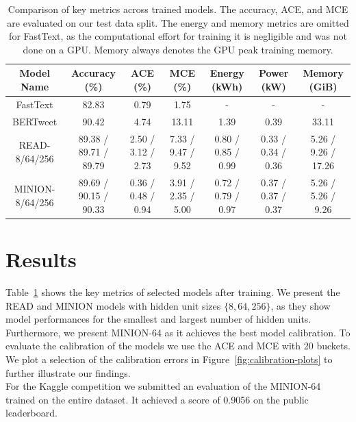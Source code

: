 \documentclass[10pt,conference,compsocconf]{IEEEtran}
\begin{document}
\begin{table}
    \centering
    \begin{tabular}[H]{|c||c|cc|ccc|}
        \hline
        Model Name & Accuracy (\%) & ACE (\%) & MCE  (\%) & Energy (kWh) & Power (kW) & Memory (GiB) \\
        \hline
        FastText & 82.83 & 0.79 & 1.75 & - & - & - \\
        BERTweet & 90.42 & 4.74 & 13.11 & 1.39 & 0.39 & 33.11 \\
        READ-8/64/256    & 89.38 / 89.71 / 89.79 & 2.50 / 3.12 / 2.73 & 7.33 / 9.47 / 9.52 & 0.80 / 0.85 / 0.99 & 0.33 / 0.34 / 0.36 & 5.26 / 9.26 / 17.26 \\
        \hline
        MINION-8/64/256 & 89.69 / 90.15 / 90.33 & 0.36 / 0.48 / 0.94 & 3.91 / 2.35 / 5.00 & 0.72 / 0.79 / 0.97 & 0.37 / 0.37 / 0.37 & 5.26 / 5.26 / 9.26 \\
        \hline
    \end{tabular}
    \caption{Comparison of key metrics across trained models. The accuracy, ACE, and MCE are evaluated on our test data split. The energy and memory metrics are omitted for FastText, as the computational effort for training it is negligible and was not done on a GPU. Memory always denotes the GPU peak training memory.}
    \label{tab:results}
\end{table}

\section{Results}
\label{sec:results}

Table~\ref{tab:results} shows the key metrics of selected models after training. We present the READ and MINION models with hidden unit sizes $\{8, 64, 256\}$, as they show model performances for the smallest and largest number of hidden units. Furthermore, we present MINION-64 as it achieves the best model calibration. To evaluate the calibration of the models we use the ACE and MCE with 20 buckets. We plot a selection of the calibration errors in Figure~\ref{fig:calibration-plots} to further illustrate our findings. \\
For the Kaggle competition \cite{ethz-cil-text-classification-2023} we submitted an evaluation of the MINION-64 trained on the entire dataset. It achieved a score of 0.9056 on the public leaderboard.
\end{document}
